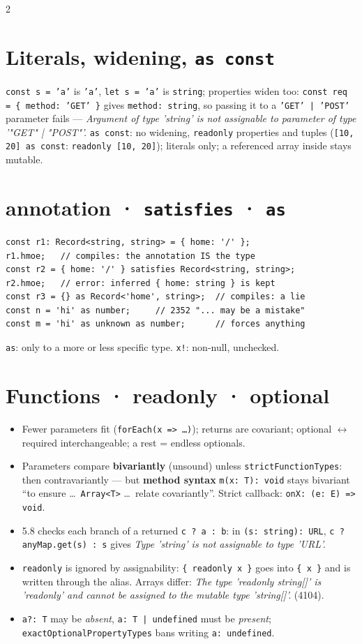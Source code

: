 \documentclass[8pt]{extarticle}
\newcommand\fa{=\pdfonly{\kern0pt}>}
\newcommand\ct[1]{\texttt{#1}}
\newcommand\msg[1]{\textcolor{sheetRed}{\emph{#1}}}
\begin{document}
\begin{multicols}{2}
\section{Literals, widening, \texttt{as const}}
\ct{const s = 'a'} is \ct{'a'}, \ct{let s = 'a'} is \ct{string}; properties widen too:
\ct{const req = \{ method: 'GET' \}} gives \ct{method: string}, so passing it to a
\ct{'GET' | 'POST'} parameter fails — \msg{Argument of type 'string' is not assignable to
parameter of type '"GET" | "POST"'.} \ct{as const}: no widening, \ct{readonly} properties and
tuples (\ct{[10, 20] as const}: \ct{readonly [10, 20]}); literals only; a referenced array
inside stays mutable.

\section{annotation · \texttt{satisfies} · \texttt{as}}
\begin{lstlisting}[language=TSSheet]
const r1: Record<string, string> = { home: '/' };
r1.hmoe;   // compiles: the annotation IS the type
const r2 = { home: '/' } satisfies Record<string, string>;
r2.hmoe;   // error: inferred { home: string } is kept
const r3 = {} as Record<'home', string>;  // compiles: a lie
const n = 'hi' as number;     // 2352 "... may be a mistake"
const m = 'hi' as unknown as number;      // forces anything
\end{lstlisting}
\ct{as}: only to a more or less specific type. \ct{x!}: non-null, unchecked.

\section{Functions · readonly · optional}
\begin{itemize}\raggedright
  \item Fewer parameters fit (\ct{forEach(x \fa{} \ldots)}); returns are covariant; optional
        $\leftrightarrow$ required interchangeable; a rest = endless optionals.
  \item Parameters compare \textbf{bivariantly} (unsound) unless \ct{strictFunctionTypes}: then
        contravariantly — but \textbf{method syntax} \ct{m(x: T): void} stays bivariant ``to
        ensure \ldots\ \ct{Array<T>} \ldots\ relate covariantly''. Strict callback:
        \ct{onX: (e: E) \fa{} void}.
  \item 5.8 checks each branch of a returned \ct{c ? a : b}: in \ct{(s: string): URL},
        \ct{c ? anyMap.get(s) : s} gives \msg{Type 'string' is not assignable to type 'URL'.}
  \item \ct{readonly} is ignored by assignability: \ct{\{ readonly x \}} goes into \ct{\{ x \}}
        and is written through the alias. Arrays differ: \msg{The type 'readonly string[]' is
        'readonly' and cannot be assigned to the mutable type 'string[]'.} (4104).
  \item \ct{a?: T} may be \emph{absent}, \ct{a: T | undefined} must be \emph{present};
        \ct{exactOptionalPropertyTypes} bans writing \ct{a: undefined}.
\end{itemize}


\end{multicols}
\end{document}
